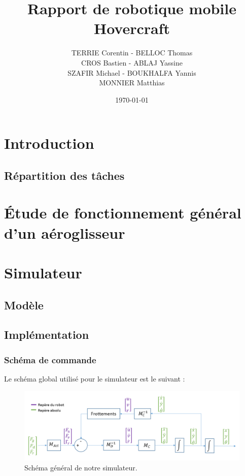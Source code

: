 \documentclass[a4paper,10pt]{article}
\title{Rapport de robotique mobile Hovercraft}
\author{TERRIE Corentin - BELLOC Thomas \\ CROS Bastien - ABLAJ Yassine \\ SZAFIR Michael - BOUKHALFA Yannis \\ MONNIER Matthias}
\date{\today}
\begin{document}

\tableofcontents
\clearpage



\section{Introduction}



\subsection{Répartition des tâches}





\section{Étude de fonctionnement général d'un aéroglisseur}



\section{Simulateur}
\subsection{Modèle}
\subsection{Implémentation}
\subsubsection{Schéma de commande}
Le schéma global utilisé pour le simulateur est le suivant :

\begin{figure}[H]
\bigcenter\includegraphics[scale=0.5]{images/commande.png}
\caption{Schéma général de notre simulateur.}
\end{figure}
\end{document}
